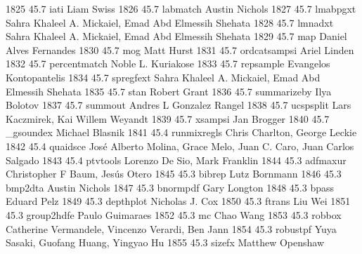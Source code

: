   1825     45.7    iati          Liam Swiss                              
  1826     45.7    labmatch      Austin Nichols                          
  1827     45.7    lmabpgxt      Sahra Khaleel A. Mickaiel, Emad Abd     
                                   Elmessih Shehata                        
  1828     45.7    lmnadxt       Sahra Khaleel A. Mickaiel, Emad Abd     
                                   Elmessih Shehata                        
  1829     45.7    map           Daniel Alves Fernandes                  
  1830     45.7    mog           Matt Hurst                              
  1831     45.7    ordcatsampsi  Ariel Linden                            
  1832     45.7    percentmatch  Noble L. Kuriakose                      
  1833     45.7    repsample     Evangelos Kontopantelis                 
  1834     45.7    spregfext     Sahra Khaleel A. Mickaiel, Emad Abd     
                                   Elmessih Shehata                        
  1835     45.7    stan          Robert Grant                            
  1836     45.7    summarizeby   Ilya Bolotov                            
  1837     45.7    summout       Andres L Gonzalez Rangel                
  1838     45.7    ucspsplit     Lars Kaczmirek, Kai Willem Weyandt      
  1839     45.7    xsampsi       Jan Brogger                             
  1840     45.7    _gsoundex     Michael Blasnik                         
  1841     45.4    runmixregls   Chris Charlton, George Leckie           
  1842     45.4    quaidsce      José Alberto Molina, Grace Melo, Juan 
                                   C. Caro, Juan Carlos Salgado            
  1843     45.4    ptvtools      Lorenzo De Sio, Mark Franklin           
  1844     45.3    adfmaxur      Christopher F Baum, Jesús Otero        
  1845     45.3    bibrep        Lutz Bornmann                           
  1846     45.3    bmp2dta       Austin Nichols                          
  1847     45.3    bnormpdf      Gary Longton                            
  1848     45.3    bpass         Eduard Pelz                             
  1849     45.3    depthplot     Nicholas J. Cox                         
  1850     45.3    ftrans        Liu Wei                                 
  1851     45.3    group2hdfe    Paulo Guimaraes                         
  1852     45.3    mc            Chao Wang                               
  1853     45.3    robbox        Catherine Vermandele, Vincenzo Verardi, 
                                   Ben Jann                                
  1854     45.3    robustpf      Yuya Sasaki, Guofang Huang, Yingyao Hu  
  1855     45.3    sizefx        Matthew Openshaw                        
